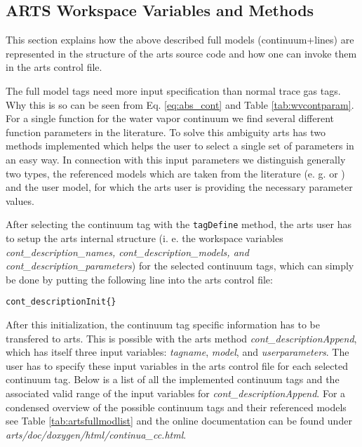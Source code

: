 \subsection{ARTS Workspace Variables and Methods}
\label{levelc:ArtsImplementationCompleteModels}

This section explains how the above described full models (continuum+lines) 
are represented in the structure of the arts source code and how 
one can invoke them in the arts control file.

The full model tags need more input specification than normal trace gas
tags. Why this is so can be seen from Eq. \ref{eq:abs_cont} and 
Table \ref{tab:wvcontparam}. For a single function for the water vapor 
continuum we find several different function parameters in the literature. 
To solve this ambiguity arts has two methods implemented which helps 
the user to select a single set of parameters in an easy way. 
In connection with this input parameters we distinguish generally two 
types, the referenced models which are taken from the literature 
(e. g. \citet{liebeetal:93} or \citet{pwr:93}) and the user model, 
for which the arts user is providing the necessary parameter values.

After selecting the continuum tag with the {\tt tagDefine} method, 
the arts user has to setup the arts internal structure (i. e. the workspace 
variables {\it cont\_description\_names, cont\_description\_models, 
and cont\_description\_parameters}) for the selected continuum tags, 
which can simply be done by putting the following line into the arts control file:
\begin{lstlisting}
cont_descriptionInit{}
\end{lstlisting}

After this initialization, the continuum tag specific
information has to be transfered to arts. This is possible with the 
arts method {\it cont\_descriptionAppend}, which has itself 
three input variables: {\it tagname}, {\it model}, and 
{\it userparameters}. The user has to specify these input 
variables in the arts control file for each selected continuum tag. 
Below is a list of all the implemented continuum tags and the associated
valid range of the input variables for {\it cont\_descriptionAppend}. 
For a condensed overview of the possible continuum tags and their 
referenced models see Table \ref{tab:artsfullmodlist} and the 
online documentation can be found under 
{\it arts/doc/doxygen/html/continua\_cc.html}.

